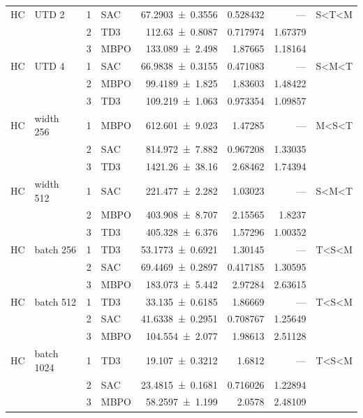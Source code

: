 {\begin{longtable}{@{}llrlrrrl@{}}
    HC & UTD 2 & \num{1} & SAC & \num{67.2903+-0.3556} & \num{0.528432} & --- & S<T<M \\
     &  & \num{2} & TD3 & \num{112.63+-0.8087} & \num{0.717974} & \num{1.67379} &  \\
     &  & \num{3} & MBPO & \num{133.089+-2.498} & \num{1.87665} & \num{1.18164} &  \\
    HC & UTD 4 & \num{1} & SAC & \num{66.9838+-0.3155} & \num{0.471083} & --- & S<M<T \\
     &  & \num{2} & MBPO & \num{99.4189+-1.825} & \num{1.83603} & \num{1.48422} &  \\
     &  & \num{3} & TD3 & \num{109.219+-1.063} & \num{0.973354} & \num{1.09857} &  \\
    HC & width 256 & \num{1} & MBPO & \num{612.601+-9.023} & \num{1.47285} & --- & M<S<T \\
     &  & \num{2} & SAC & \num{814.972+-7.882} & \num{0.967208} & \num{1.33035} &  \\
     &  & \num{3} & TD3 & \num{1421.26+-38.16} & \num{2.68462} & \num{1.74394} &  \\
    HC & width 512 & \num{1} & SAC & \num{221.477+-2.282} & \num{1.03023} & --- & S<M<T \\
     &  & \num{2} & MBPO & \num{403.908+-8.707} & \num{2.15565} & \num{1.8237} &  \\
     &  & \num{3} & TD3 & \num{405.328+-6.376} & \num{1.57296} & \num{1.00352} &  \\
    HC & batch 256 & \num{1} & TD3 & \num{53.1773+-0.6921} & \num{1.30145} & --- & T<S<M \\
     &  & \num{2} & SAC & \num{69.4469+-0.2897} & \num{0.417185} & \num{1.30595} &  \\
     &  & \num{3} & MBPO & \num{183.073+-5.442} & \num{2.97284} & \num{2.63615} &  \\
    HC & batch 512 & \num{1} & TD3 & \num{33.135+-0.6185} & \num{1.86669} & --- & T<S<M \\
     &  & \num{2} & SAC & \num{41.6338+-0.2951} & \num{0.708767} & \num{1.25649} &  \\
     &  & \num{3} & MBPO & \num{104.554+-2.077} & \num{1.98613} & \num{2.51128} &  \\
    HC & batch 1024 & \num{1} & TD3 & \num{19.107+-0.3212} & \num{1.6812} & --- & T<S<M \\
     &  & \num{2} & SAC & \num{23.4815+-0.1681} & \num{0.716026} & \num{1.22894} &  \\
     &  & \num{3} & MBPO & \num{58.2597+-1.199} & \num{2.0578} & \num{2.48109} &  \\

\end{longtable}}
